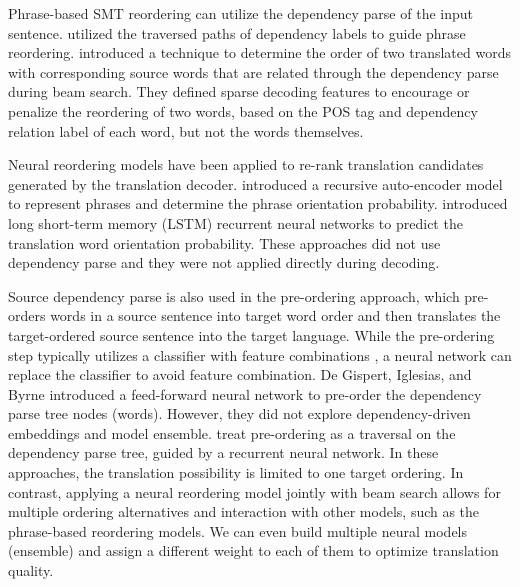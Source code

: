 \documentclass[letterpaper]{article}
\begin{document}
Phrase-based SMT reordering can utilize the dependency parse of the input sentence. \citeauthor{chang_discriminative_2009}  utilized the traversed paths of dependency labels to guide phrase reordering. \citeauthor{hadiwinoto_swap_2016}  introduced a technique to determine the order of two translated words with corresponding source words that are related through the dependency parse during beam search. They defined sparse decoding features to encourage or penalize the reordering of two words, based on the POS tag and dependency relation label of each word, but not the words themselves.

Neural reordering models have been applied to re-rank translation candidates generated by the translation decoder. \citeauthor{li_neural_2014}  introduced a recursive auto-encoder model to represent phrases and determine the phrase orientation probability. \citeauthor{cui_lstm_2016}  introduced long short-term memory (LSTM) recurrent neural networks to predict the translation word orientation probability. These approaches did not use dependency parse and they were not applied directly during decoding.

Source dependency parse is also used in the pre-ordering approach, which pre-orders words in a source sentence into target word order and then translates the target-ordered source sentence into the target language. While the pre-ordering step typically utilizes a classifier with feature combinations \cite{lerner_source-side_2013,jehl_source-side_2014}, a neural network can replace the classifier to avoid feature combination. De Gispert, Iglesias, and Byrne  introduced a feed-forward neural network to pre-order the dependency parse tree nodes (words). However, they did not explore dependency-driven embeddings and model ensemble. \citeauthor{miceli-barone_non-projective_2015}  treat pre-ordering as a traversal on the dependency parse tree, guided by a recurrent neural network. In these approaches, the translation possibility is limited to one target ordering. In contrast, applying a neural reordering model jointly with beam search allows for multiple ordering alternatives and interaction with other models, such as the phrase-based reordering models. We can even build multiple neural models (ensemble) and assign a different weight to each of them to optimize translation quality.
\end{document}
